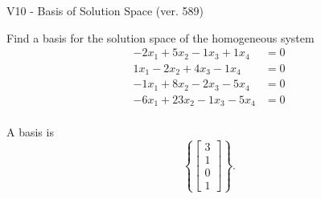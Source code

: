 \begin{exercise}
  \begin{exerciseTitle}V10 - Basis of Solution Space (ver. 589)\end{exerciseTitle}
  \begin{exerciseStatement}
    Find a basis for the solution space of the homogeneous system 
\begin{align*}
 -2 x_ 1 + 5 x_ 2 -1 x_ 3 + 1 x_ 4 &= 0  \\ 
  1 x_ 1 -2 x_ 2 + 4 x_ 3 -1 x_ 4 &= 0  \\ 
  -1 x_ 1 + 8 x_ 2 -2 x_ 3 -5 x_ 4 &= 0  \\ 
  -6 x_ 1 + 23 x_ 2 -1 x_ 3 -5 x_ 4 &= 0  \\ 
 \end{align*}


 
  \end{exerciseStatement}

  \begin{exerciseAnswer}
   A basis is   
\[\left\{\left[\begin{array}{c}
3 \\
1 \\
0 \\
1
\end{array}\right]\right\}.\]

  


  \end{exerciseAnswer}
\end{exercise}